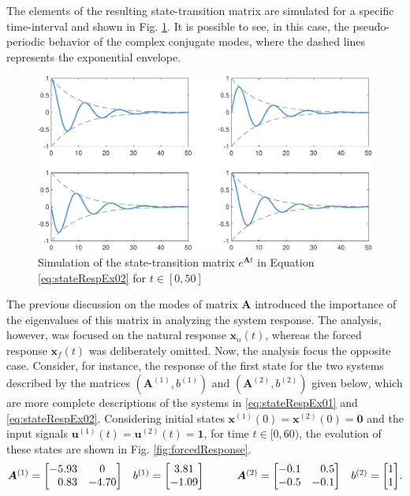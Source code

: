 \documentclass[a4paper,11pt]{book}
\numberwithin{figure}{chapter}
\numberwithin{equation}{chapter}
\numberwithin{table}{chapter}
\theoremstyle{definition}
\begin{document}
The elements of the resulting state-transition matrix are simulated for a specific time-interval and shown in Fig. \ref{fig:stateTrans02}. It is possible to see, in this case, the pseudo-periodic behavior of the complex conjugate modes, where the dashed lines represents the exponential envelope. 

\begin{figure}[ht]
    \centering
    \includegraphics[width=\textwidth]{chapter2/stateTrans02}
    \caption{Simulation of the state-transition matrix $e^{\bm{A} t}$ in Equation \eqref{eq:stateRespEx02} for $t \in [0,50]$}
    \label{fig:stateTrans02}
\end{figure}

The previous discussion on the modes of matrix $\bm{A}$ introduced the importance of the eigenvalues of this matrix in analyzing the system response. The analysis, however, was focused on the natural response $\bm{x}_n(t)$, whereas the forced response $\bm{x}_f(t)$ was deliberately omitted. Now, the analysis focus the opposite case. Consider, for instance, the response of the first state for the two systems described by the matrices $(\bm{A}^{(1)}, b^{(1)})$ and $(\bm{A}^{(2)}, b^{(2)})$ given below, which are more complete descriptions of the systems in \eqref{eq:stateRespEx01} and \eqref{eq:stateRespEx02}. Considering initial states $\bm{x}^{(1)}(0) = \bm{x}^{(2)}(0) = \bm{0}$ and the input signals $\bm{u}^{(1)}(t) = \bm{u}^{(2)}(t) = \bm{1}$, for time $t \in [0, 60)$, the evolution of these states are shown in Fig. \ref{fig:forcedResponse}.
\begin{equation} \label{eq:isoSys02}
\begin{matrix}
    \bm{A}^{(1)} = \begin{bmatrix} 
        -5.93  &      0 \\
        \hfill 0.83   &  -4.70 
    \end{bmatrix} & b^{(1)} = \begin{bmatrix} 3.81 \\ -1.09 \end{bmatrix} & & & \bm{A}^{(2)} = \begin{bmatrix} 
         -0.1  &  \hfill 0.5 \\
        -0.5   &  -0.1 
    \end{bmatrix} & b^{(2)} = \begin{bmatrix} 1 \\ 1 \end{bmatrix}
\end{matrix}
.\end{equation}
\end{document}
